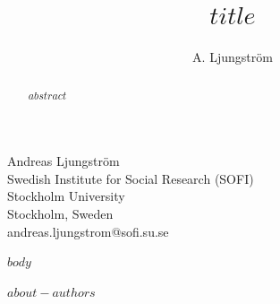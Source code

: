 
\author{A. Ljungstr\"om}{%
  Andreas Ljungstr\"om\\
  Swedish Institute for Social Research (SOFI)\\
  Stockholm University\\
  Stockholm, Sweden\\
  andreas.ljungstrom@sofi.su.se
}
\title[$title-short$]{%
  $title$}
\maketitle

\begin{abstract}
$abstract$

\end{abstract}

\providecommand{\tightlist}{}

$body$




\begin{aboutauthors}
$about-authors$
\end{aboutauthors}

\endinput
